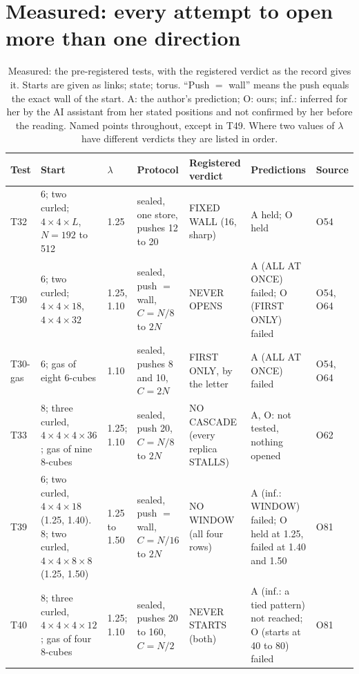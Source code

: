 \documentclass[aps,pre,10pt,twocolumn,superscriptaddress,nofootinbib]{revtex4-2}
\begin{document}
\section{Measured: every attempt to open more than one direction}
\label{sec:runs}

\begin{table}[t]
\caption{Measured: the pre-registered tests, with the registered verdict as the record gives it. Starts are given as
links; state; torus. ``Push $=$ wall'' means the push equals the exact wall of the start. A: the author's
prediction; O: ours; inf.: inferred for her by the AI assistant from her stated positions and not confirmed by her
before the reading. Named points throughout, except in T49. Where two values of $\lambda$ have different verdicts
they are listed in order.}
\label{tab:runs}
\footnotesize
\newcommand{\rr}{\raggedright}
\begin{ruledtabular}
\begin{tabular}{lp{}lp{}p{}p{}l}
Test & Start & $\lambda$ & Protocol & Registered verdict & Predictions & Source \\
\hline
T32 & \rr 6; two curled; $4 \times 4 \times L$, $N = 192$ to 512 & 1.25 & \rr sealed, one store, pushes 12 to 20 &
\rr FIXED WALL (16, sharp) & \rr A held; O held & O54 \\
T30 & \rr 6; two curled; $4 \times 4 \times 18$, $4 \times 4 \times 32$ & 1.25, 1.10 & \rr sealed, push $=$ wall,
$C = N/8$ to $2N$ & \rr NEVER OPENS & \rr A (ALL AT ONCE) failed; O (FIRST ONLY) failed & O54, O64 \\
T30-gas & \rr 6; gas of eight 6-cubes & 1.10 & \rr sealed, pushes 8 and 10, $C = 2N$ & \rr FIRST ONLY, by the letter &
\rr A (ALL AT ONCE) failed & O54, O64 \\
T33 & \rr 8; three curled, $4 \times 4 \times 4 \times 36$; gas of nine 8-cubes & 1.25; 1.10 & \rr sealed, push 20,
$C = N/8$ to $2N$ & \rr NO CASCADE (every replica STALLS) & \rr A, O: not tested, nothing opened & O62 \\
T39 & \rr 6; two curled, $4 \times 4 \times 18$ (1.25, 1.40). 8; two curled, $4 \times 4 \times 8 \times 8$ (1.25,
1.50) & 1.25 to 1.50
& \rr sealed, push $=$ wall, $C = N/16$ to $2N$ & \rr NO WINDOW (all four rows) & \rr A (inf.: WINDOW) failed; O held at 1.25,
failed at 1.40 and 1.50 & O81 \\
T40 & \rr 8; three curled, $4 \times 4 \times 4 \times 12$; gas of four 8-cubes & 1.25; 1.10 & \rr sealed, pushes 20 to 160,
$C = N/2$ & \rr NEVER STARTS (both) & \rr A (inf.: a tied pattern) not reached; O (starts at 40 to 80) failed & O81 \\

\end{tabular}
\end{ruledtabular}
\end{table}
\end{document}
